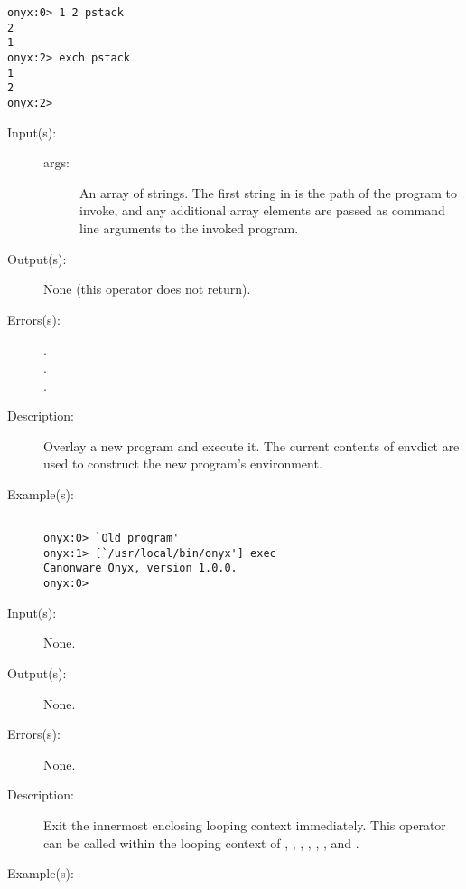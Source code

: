 \begin{description}
\begin{description}
\begin{verbatim}
onyx:0> 1 2 pstack
2
1
onyx:2> exch pstack
1
2
onyx:2>
		\end{verbatim}
	\end{description}
\label{systemdict:exec}
\item[{\onyxop{args}{exec}{--}}: ]
	\begin{description}\item[]
	\item[Input(s): ]
		\begin{description}\item[]
		\item[args: ]
			An array of strings.  The first string in 
			is the path of the program to invoke, and any additional
			array elements are passed as command line arguments to
			the invoked program.
		\end{description}
	\item[Output(s): ] None (this operator does not return).
	\item[Errors(s): ]
		\begin{description}\item[]
		\item[.]
		\item[.]
		\item[.]
		\end{description}
	\item[Description: ]
		Overlay a new program and execute it.  The current contents of
		envdict are used to construct the new program's environment.
	\item[Example(s): ]\begin{verbatim}

onyx:0> `Old program'
onyx:1> [`/usr/local/bin/onyx'] exec
Canonware Onyx, version 1.0.0.
onyx:0>
		\end{verbatim}
	\end{description}
\label{systemdict:exit}
\item[{\onyxop{--}{exit}{--}}: ]
	\begin{description}\item[]
	\item[Input(s): ] None.
	\item[Output(s): ] None.
	\item[Errors(s): ] None.
	\item[Description: ]
		Exit the innermost enclosing looping context immediately.
		This operator can be called within the looping context of
		,
		,
		,
		,
		,
		, and
		.
	\item[Example(s): ]\begin{verbatim}


\end{verbatim}
\end{description}
\end{description}

